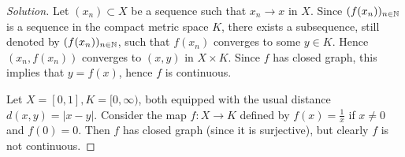 \begin{proof}[Solution]
	Let $(x_n)\subset X$ be a sequence such that $x_n \to x$ in $X$. Since $(f(x_n))_{n\in\mathbb{N}}$ is a sequence in the compact metric space $K$, there exists a subsequence, still denoted by $(f(x_n))_{n\in\mathbb{N}}$, such that $f(x_n)$ converges to some $y \in K$. Hence $(x_n, f(x_n))$ converges to $(x,y)$ in $X\times K$. Since $f$ has closed graph, this implies that $y=f(x)$, hence $f$ is continuous.
	
	Let $X=[0,1], K=[0, \infty)$, both equipped with the usual distance $d(x,y) = |x-y|$. Consider the map $f:X\to K$ defined by $f(x) = \frac{1}{x}$ if $x\ne 0$ and $f(0)=0$. Then $f$ has closed graph (since it is surjective), but clearly $f$ is not continuous.
\end{proof}